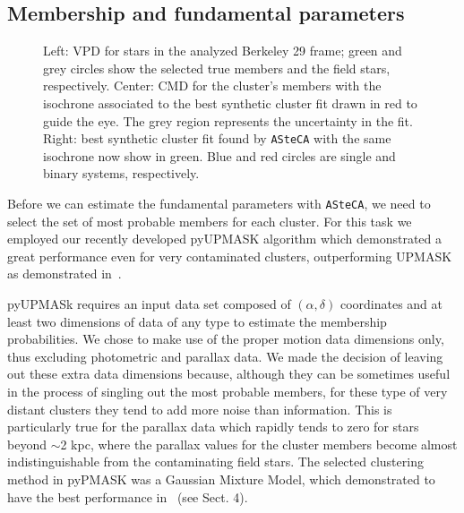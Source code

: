 \documentclass{aa}
\begin{document}
 \subsection{Membership and fundamental parameters}
  \label{ssec:fund_pars}

  \begin{figure}
   \caption{Left: VPD for stars in the analyzed Berkeley 29
    frame; green and grey circles show the selected true members and the field
    stars, respectively.
    Center: CMD for the cluster's members with the isochrone associated to the
    best synthetic cluster fit drawn in red to guide the eye. The grey region
    represents the uncertainty in the fit.
    Right: best synthetic cluster fit found by \texttt{ASteCA} with the same
    isochrone now show in green. Blue and red circles are single and binary
    systems, respectively.}
   \label{fig:BER29_fpars}
  \end{figure}

  Before we can estimate the fundamental parameters with \texttt{ASteCA}, we
  need to select the set of most probable members for each cluster. For this
  task we employed our recently developed pyUPMASK algorithm which demonstrated
  a great performance even for very contaminated clusters, outperforming
  UPMASK~\citep{Krone2014} as demonstrated in~\cite{Pera_2021}.

  pyUPMASk requires an input data set composed of $(\alpha, \delta)$ coordinates
  and at least two dimensions of data of any type to estimate the membership
  probabilities. We chose to make use of the proper motion data dimensions only,
  thus excluding photometric and parallax data.
  We made the decision of leaving out these extra data dimensions because,
  although they can be sometimes useful in the process of singling out the most
  probable members, for these type of very distant clusters they tend to add
  more noise than information.
  This is particularly true for the parallax data which
  rapidly tends to zero for stars beyond $\sim$2 kpc, where the parallax values
  for the cluster members become almost indistinguishable from the contaminating
  field stars. The selected clustering method in pyPMASK was a Gaussian Mixture
  Model, which demonstrated to have the best performance in~\cite{Pera_2021} 
  (see Sect. 4).
\end{document}
